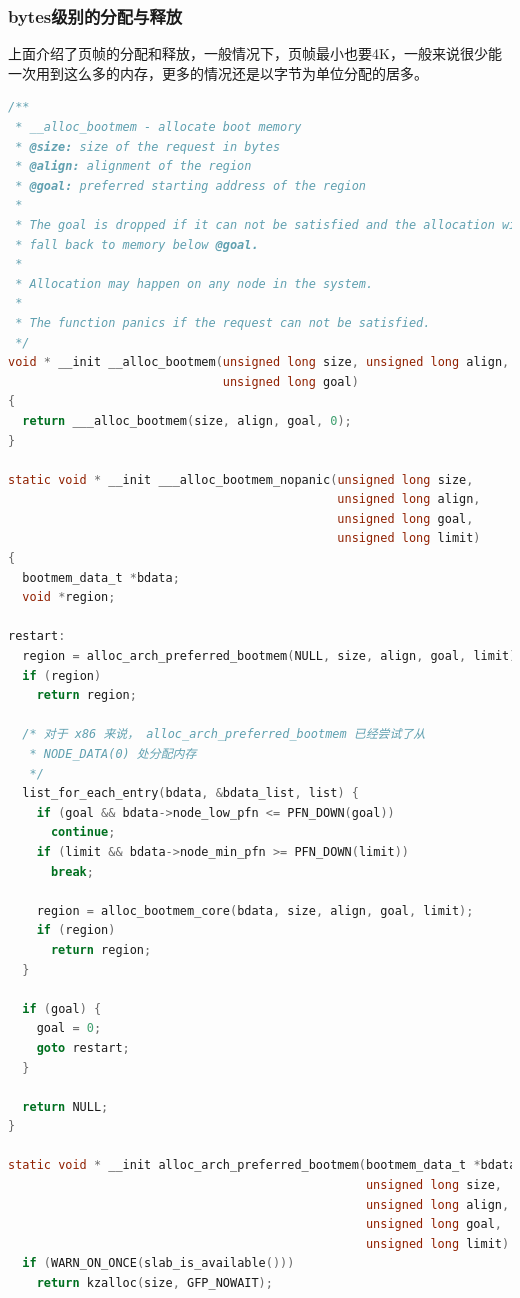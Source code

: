\documentclass[b5paper,9pt,twoside,openany]{article}
\begin{document}
\subsubsection{bytes级别的分配与释放}
上面介绍了页帧的分配和释放，一般情况下，页帧最小也要4K，一般来说很少能一次用到这么多的内存，更多的情况还是以字节为单位分配的居多。
\begin{lstlisting}[language=C]
/**
 * __alloc_bootmem - allocate boot memory
 * @size: size of the request in bytes
 * @align: alignment of the region
 * @goal: preferred starting address of the region
 *
 * The goal is dropped if it can not be satisfied and the allocation will
 * fall back to memory below @goal.
 *
 * Allocation may happen on any node in the system.
 *
 * The function panics if the request can not be satisfied.
 */
void * __init __alloc_bootmem(unsigned long size, unsigned long align,
                              unsigned long goal)
{
  return ___alloc_bootmem(size, align, goal, 0);
}

static void * __init ___alloc_bootmem_nopanic(unsigned long size,
                                              unsigned long align,
                                              unsigned long goal,
                                              unsigned long limit)
{
  bootmem_data_t *bdata;
  void *region;

restart:
  region = alloc_arch_preferred_bootmem(NULL, size, align, goal, limit);
  if (region)
    return region;

  /* 对于 x86 来说， alloc_arch_preferred_bootmem 已经尝试了从
   * NODE_DATA(0) 处分配内存
   */
  list_for_each_entry(bdata, &bdata_list, list) {
    if (goal && bdata->node_low_pfn <= PFN_DOWN(goal))
      continue;
    if (limit && bdata->node_min_pfn >= PFN_DOWN(limit))
      break;

    region = alloc_bootmem_core(bdata, size, align, goal, limit);
    if (region)
      return region;
  }

  if (goal) {
    goal = 0;
    goto restart;
  }

  return NULL;
}

static void * __init alloc_arch_preferred_bootmem(bootmem_data_t *bdata,
                                                  unsigned long size,
                                                  unsigned long align,
                                                  unsigned long goal,
                                                  unsigned long limit) {
  if (WARN_ON_ONCE(slab_is_available()))
    return kzalloc(size, GFP_NOWAIT);


\end{lstlisting}
\end{document}

